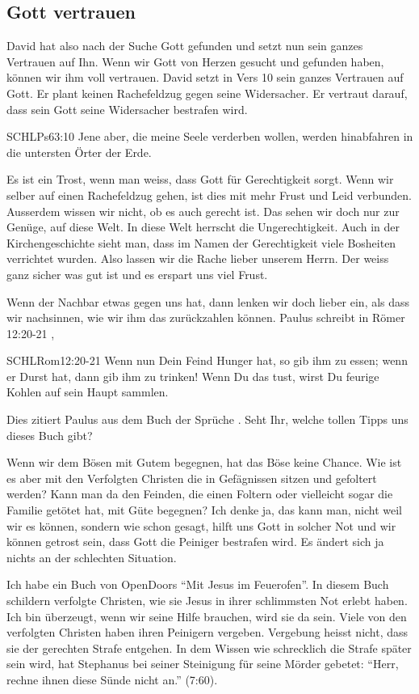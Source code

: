 \documentclass[14pt]{../../inc/mybib}
\begin{document}
    \subsection*{Gott vertrauen}
    \begin{block}
    David hat also nach der Suche Gott gefunden und setzt nun sein ganzes Vertrauen auf Ihn.
    Wenn wir Gott von Herzen gesucht und gefunden haben, können wir ihm voll vertrauen. David setzt in Vers 10 sein ganzes Vertrauen auf Gott. Er plant keinen Rachefeldzug gegen seine Widersacher. Er vertraut darauf, dass sein Gott seine Widersacher bestrafen wird.
    \begin{bibelbox}{SCHL}{Ps}{63:10}
        Jene aber, die meine Seele verderben wollen, werden hinabfahren in die untersten Örter der Erde.
    \end{bibelbox}
    Es ist ein Trost, wenn man weiss, dass Gott für Gerechtigkeit sorgt. Wenn wir selber auf einen Rachefeldzug gehen, ist dies mit  mehr Frust und Leid verbunden. Ausserdem wissen wir nicht, ob es auch gerecht ist. Das sehen wir doch nur zur Genüge, auf diese Welt. In diese Welt herrscht die Ungerechtigkeit. Auch in der Kirchengeschichte sieht man, dass im Namen der Gerechtigkeit viele Bosheiten verrichtet wurden. Also lassen wir die Rache lieber unserem Herrn. Der weiss ganz sicher was gut ist und es erspart uns viel Frust. 
    \end{block}
    \begin{block}
    Wenn der Nachbar etwas gegen uns hat, dann lenken wir doch lieber ein, als dass wir nachsinnen, wie wir ihm das zurückzahlen können. Paulus schreibt in Römer 12:20-21 , 
    \begin{bibelbox}{SCHL}{Rom}{12:20-21}
        Wenn nun Dein Feind Hunger hat, so gib ihm zu essen; wenn er Durst hat, dann gib ihm zu trinken! Wenn Du das tust, wirst Du feurige Kohlen auf sein Haupt sammlen.
    \end{bibelbox}
    Dies zitiert Paulus aus dem Buch der Sprüche . Seht Ihr, welche tollen Tipps uns dieses Buch gibt?

    Wenn wir dem Bösen mit Gutem begegnen, hat das Böse keine Chance. Wie ist es aber mit den Verfolgten Christen die in Gefägnissen sitzen und gefoltert werden? Kann man da den Feinden, die einen Foltern oder vielleicht sogar die Familie getötet hat, mit Güte begegnen? Ich denke ja, das kann man, nicht weil wir es können, sondern wie schon gesagt, hilft uns Gott in solcher Not und wir können getrost sein, dass Gott die Peiniger bestrafen wird. Es ändert sich ja nichts an der schlechten Situation. 
    
    Ich habe ein Buch von OpenDoors \enquote{Mit Jesus im Feuerofen}. In diesem Buch schildern verfolgte Christen, wie sie Jesus in ihrer schlimmsten Not erlebt haben. Ich bin überzeugt, wenn wir seine Hilfe brauchen, wird sie da sein. Viele von den verfolgten Christen haben ihren Peinigern vergeben. Vergebung heisst nicht, dass sie der gerechten Strafe entgehen. In dem Wissen wie schrecklich die Strafe später sein wird, hat Stephanus bei seiner Steinigung für seine Mörder gebetet: \enquote{Herr, rechne ihnen diese Sünde nicht an.} (7:60).
\end{block}
\end{document}
